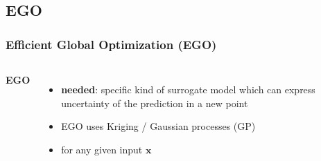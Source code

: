 \documentclass[sans,mathserif]{beamer}
\newcommand{\xx}{\mathrm{\mathbf{x}}}
\begin{document}
\subsection{EGO}

\begin{frame}
  \frametitle{Efficient Global Optimization (EGO)}
  \begin{columns}[T]
  \column{5cm}
    \textbf{EGO} %
    \begin{itemize}
      \item<1-> \textbf{needed}: specific kind of surrogate model which can express \alert{uncertainty of the prediction} in a new point
      \item<1-> EGO uses Kriging / Gaussian processes (GP)
      \item<2-> for any given input $\xx$
    \end{itemize}
  \column{5.5cm}
\end{columns}
\end{frame}
\end{document}
